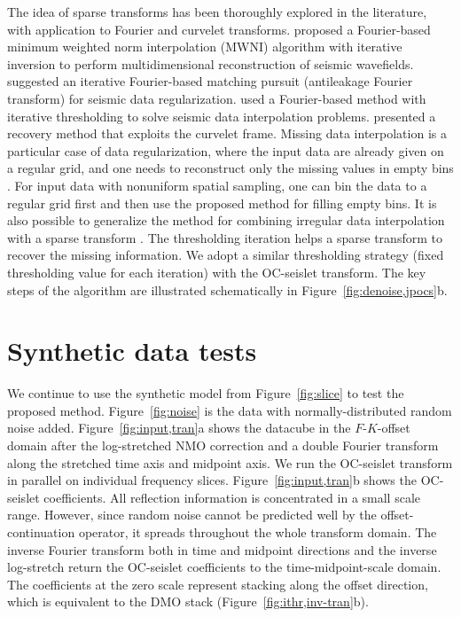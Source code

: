 The idea of sparse transforms has been thoroughly explored in the
literature, with application to Fourier and curvelet
transforms. \cite{Liu04} proposed a Fourier-based minimum weighted
norm interpolation (MWNI) algorithm with iterative inversion to
perform multidimensional reconstruction of seismic
wavefields. \cite{Xu05} suggested an iterative Fourier-based matching
pursuit (antileakage Fourier transform) for seismic data
regularization. \cite{Abma06} used a Fourier-based method with
iterative thresholding to solve seismic data interpolation
problems. \cite{Herrman08} presented a recovery method that exploits
the curvelet frame. Missing data interpolation is a particular case of
data regularization, where the input data are already given on a
regular grid, and one needs to reconstruct only the missing values in
empty bins \cite[]{Fomel01a}. For input data with nonuniform
spatial sampling, one can bin the data to a regular grid first and
then use the proposed method for filling empty bins. It is also
possible to generalize the method for combining irregular data
interpolation with a sparse transform \cite[]{Zwartjes07}. The
thresholding iteration helps a sparse transform to recover the missing
information. We adopt a similar thresholding strategy (fixed
thresholding value for each iteration) with the OC-seislet
transform. The key steps of the algorithm are illustrated
schematically in Figure~\ref{fig:denoise,jpocs}b.



 \section{Synthetic data tests}

 We continue to use the synthetic model from Figure~\ref{fig:slice} to
 test the proposed method. Figure~\ref{fig:noise} is the data with
 normally-distributed random noise added. Figure~\ref{fig:input,tran}a
 shows the datacube in the $F$-$K$-offset domain after the
 log-stretched NMO correction and a double Fourier transform along the
 stretched time axis and midpoint axis. We run the OC-seislet
 transform in parallel on individual frequency
 slices. Figure~\ref{fig:input,tran}b shows the OC-seislet
 coefficients. All reflection information is concentrated in a small
 scale range. However, since random noise cannot be predicted well by
 the offset-continuation operator, it spreads throughout the whole
 transform domain. The inverse Fourier transform both in time and
 midpoint directions and the inverse log-stretch return the OC-seislet
 coefficients to the time-midpoint-scale domain. The coefficients at
 the zero scale represent stacking along the offset direction, which
 is equivalent to the DMO stack (Figure~\ref{fig:ithr,inv-tran}b).

